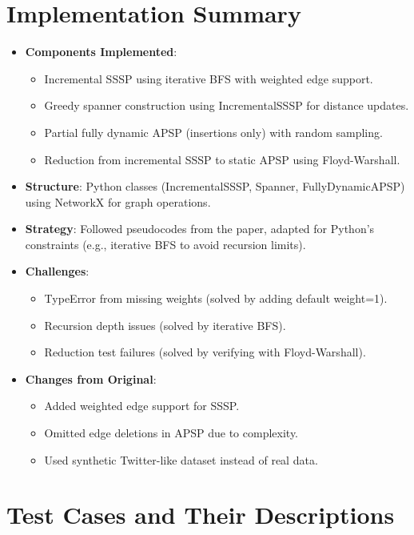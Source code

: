 \documentclass[11pt]{article}
\begin{document}
\section{Implementation Summary}
\begin{itemize}
    \item \textbf{Components Implemented}:
    \begin{itemize}
        \item Incremental SSSP using iterative BFS with weighted edge support.
        \item Greedy spanner construction using IncrementalSSSP for distance updates.
        \item Partial fully dynamic APSP (insertions only) with random sampling.
        \item Reduction from incremental SSSP to static APSP using Floyd-Warshall.
    \end{itemize}
    \item \textbf{Structure}: Python classes (IncrementalSSSP, Spanner, FullyDynamicAPSP) using NetworkX for graph operations.
    \item \textbf{Strategy}: Followed pseudocodes from the paper, adapted for Python’s constraints (e.g., iterative BFS to avoid recursion limits).
    \item \textbf{Challenges}:
    \begin{itemize}
        \item TypeError from missing weights (solved by adding default weight=1).
        \item Recursion depth issues (solved by iterative BFS).
        \item Reduction test failures (solved by verifying with Floyd-Warshall).
    \end{itemize}
    \item \textbf{Changes from Original}:
    \begin{itemize}
        \item Added weighted edge support for SSSP.
        \item Omitted edge deletions in APSP due to complexity.
        \item Used synthetic Twitter-like dataset instead of real data.
    \end{itemize}
\end{itemize}

\section{Test Cases and Their Descriptions}
\end{document}
